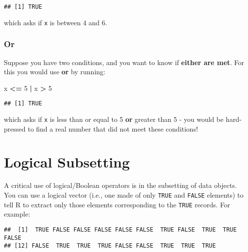 \documentclass[]{book}
\newenvironment{Shaded}{\begin{snugshade}}{\end{snugshade}}
\newcommand{\DecValTok}[1]{\textcolor[rgb]{0.00,0.00,0.81}{#1}}
\newcommand{\StringTok}[1]{\textcolor[rgb]{0.31,0.60,0.02}{#1}}
\newcommand{\CommentTok}[1]{\textcolor[rgb]{0.56,0.35,0.01}{\textit{#1}}}
\newcommand{\OperatorTok}[1]{\textcolor[rgb]{0.81,0.36,0.00}{\textbf{#1}}}
\newcommand{\NormalTok}[1]{#1}
\theoremstyle{definition}
\theoremstyle{definition}
\theoremstyle{definition}
\theoremstyle{remark}
\begin{document}
\begin{verbatim}
## [1] TRUE
\end{verbatim}

which asks if \texttt{x} is between 4 and 6.

\subsubsection*{Or}\label{or}

Suppose you have two conditions, and you want to know if \textbf{either
are met}. For this you would use \textbf{or} by running:

\begin{Shaded}
\begin{Highlighting}[]
\NormalTok{x }\OperatorTok{<=}\StringTok{ }\DecValTok{5} \OperatorTok{|}\StringTok{ }\NormalTok{x }\OperatorTok{>}\StringTok{ }\DecValTok{5}
\end{Highlighting}
\end{Shaded}

\begin{verbatim}
## [1] TRUE
\end{verbatim}

which asks if \texttt{x} is less than or equal to 5 \textbf{or} greater
than 5 - you would be hard-pressed to find a real number that did not
meet these conditions!

\section{Logical Subsetting}\label{logsub}

A critical use of logical/Boolean operators is in the subsetting of data
objects. You can use a logical vector (i.e., one made of only
\texttt{TRUE} and \texttt{FALSE} elements) to tell R to extract only
those elements corresponding to the \texttt{TRUE} records. For example:

\begin{Shaded}
\end{Shaded}

\begin{verbatim}
##  [1]  TRUE FALSE FALSE FALSE FALSE FALSE  TRUE FALSE  TRUE  TRUE FALSE
## [12] FALSE  TRUE  TRUE  TRUE FALSE FALSE  TRUE  TRUE  TRUE
\end{verbatim}
\end{document}
